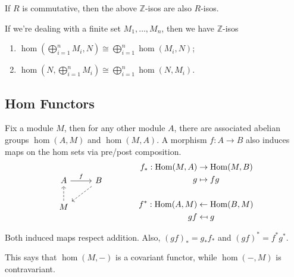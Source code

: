 \documentclass[twoside,10pt]{report}
\begin{document}
\begin{cor}
If $R$ is commutative, then the above $\mathbb{Z}$-isos are also $R$-isos.
\end{cor}

\begin{cor}
	If we're dealing with a finite set ${M}_1, \dots, {M}_{n}$, then we have $\mathbb{Z}$-isos
	\begin{enumerate}
		\item $\hom(\bigoplus_{i=1}^{n}M_{i}, N) \cong \bigoplus_{i=1}^{n}\hom(M_i,N)$;
		\item $\hom(N, \bigoplus_{i=1}^{n}M_i) \cong \bigoplus_{i=1}^{n}\hom(N, M_i)$.
	\end{enumerate}
\end{cor}

\subsection{Hom Functors}

Fix a module $M$, then for any other module $A$, there are associated abelian groups $\hom(A,M)$ and $\hom(M,A)$. A morphism $f:A\to B$ also induces maps on the hom sets via pre/post composition.
\begin{equation*}
        \begin{aligned}[c]
                \begin{tikzcd}
			A \rar{f} & B \arrow[dl, dashed] \\
			M \uar[dashed]
                \end{tikzcd}
        \end{aligned}
        \qquad\qquad
        \begin{aligned}[c]
		f_{*}: \hom(M, A) &\to \hom(M,B) \\
		g &\mapsto fg\\ \\
		f^{*}: \hom(A, M) &\leftarrow \hom(B,M) \\
		gf &\mapsfrom g
        \end{aligned}
\end{equation*}

\begin{prop}
	Both induced maps respect addition. Also, $(gf)_{*}=g_{*}f_{*}$ and $(gf)^{*}=f^{*}g^{*}$.
\end{prop}
\begin{note}
	This says that $\hom(M,-)$ is a covariant functor, while $\hom(-,M)$ is contravariant.
\end{note}
\end{document}
